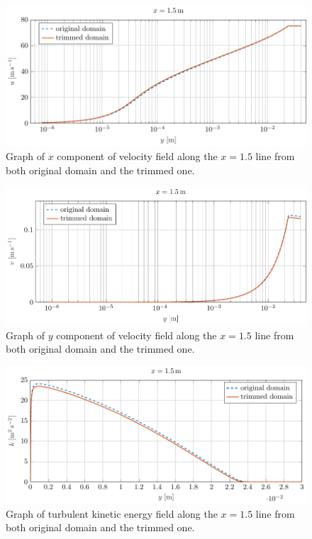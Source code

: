 \begin{figure}
\centering
\includegraphics[width=14cm]{Results/ux15.pdf}
\caption{Graph of $x$ component of velocity field along the $x=1.5$ line from both original domain and the trimmed one.}
\label{fig::ux15}
\end{figure}

\begin{figure}
\centering
\includegraphics[width=14cm]{Results/uy15.pdf}
\caption{Graph of $y$ component of velocity field along the $x=1.5$ line from both original domain and the trimmed one.}
\label{fig::uy15}
\end{figure}

\begin{figure}
\centering
\includegraphics[width=14cm]{Results/k15.pdf}
\caption{Graph of turbulent kinetic energy field along the $x=1.5$ line from both original domain and the trimmed one.}
\label{fig::k15}
\end{figure}

